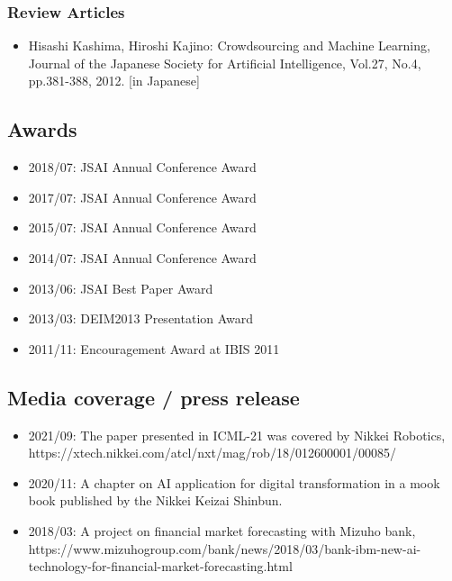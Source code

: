 \documentclass[a4paper,9pt]{article}
\begin{document}
\subsubsection*{Review Articles}
\begin{itemize}
 \item Hisashi Kashima, Hiroshi Kajino: Crowdsourcing and Machine Learning, Journal of the Japanese Society for Artificial Intelligence, Vol.27, No.4, pp.381-388, 2012. [in Japanese]
\end{itemize}


\subsection*{Awards}
\begin{itemize}
 \item 2018/07: JSAI Annual Conference Award
 \item 2017/07: JSAI Annual Conference Award
 \item 2015/07: JSAI Annual Conference Award
 \item 2014/07: JSAI Annual Conference Award
 \item 2013/06: JSAI Best Paper Award
 \item 2013/03: DEIM2013 Presentation Award
 \item 2011/11: Encouragement Award at IBIS 2011
\end{itemize}

\subsection*{Media coverage / press release}
\begin{itemize}
 \item 2021/09: The paper presented in ICML-21 was covered by Nikkei Robotics,  https://xtech.nikkei.com/atcl/nxt/mag/rob/18/012600001/00085/
 \item 2020/11: A chapter on AI application for digital transformation in a mook book published by the Nikkei Keizai Shinbun.
 \item 2018/03: A project on financial market forecasting with Mizuho bank, https://www.mizuhogroup.com/bank/news/2018/03/bank-ibm-new-ai-technology-for-financial-market-forecasting.html
\end{itemize}
\end{document}
